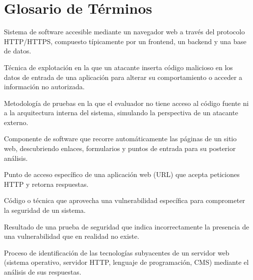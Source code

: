 \documentclass[12pt, a4paper]{article}
\begin{document}
\newpage
\section*{Glosario de Términos}

\begin{description}[style=nextline, leftmargin=1.5cm]
    \item[\textbf{Aplicación web}] Sistema de software accesible mediante un
    navegador web a través del protocolo HTTP/HTTPS, compuesto típicamente por
    un frontend, un backend y una base de datos.

    \item[\textbf{Ataque de inyección}] Técnica de explotación en la que un
    atacante inserta código malicioso en los datos de entrada de una aplicación
    para alterar su comportamiento o acceder a información no autorizada.

    \item[\textbf{Caja negra}] Metodología de pruebas en la que el evaluador
    no tiene acceso al código fuente ni a la arquitectura interna del sistema,
    simulando la perspectiva de un atacante externo.

    \item[\textbf{Crawler}] Componente de software que recorre automáticamente
    las páginas de un sitio web, descubriendo enlaces, formularios y puntos
    de entrada para su posterior análisis.

    \item[\textbf{Endpoint}] Punto de acceso específico de una aplicación web
    (URL) que acepta peticiones HTTP y retorna respuestas.

    \item[\textbf{Exploit}] Código o técnica que aprovecha una vulnerabilidad
    específica para comprometer la seguridad de un sistema.

    \item[\textbf{Falso positivo}] Resultado de una prueba de seguridad que
    indica incorrectamente la presencia de una vulnerabilidad que en realidad
    no existe.

    \item[\textbf{Fingerprinting}] Proceso de identificación de las tecnologías
    subyacentes de un servidor web (sistema operativo, servidor HTTP, lenguaje
    de programación, CMS) mediante el análisis de sus respuestas.


\end{description}
\end{document}
